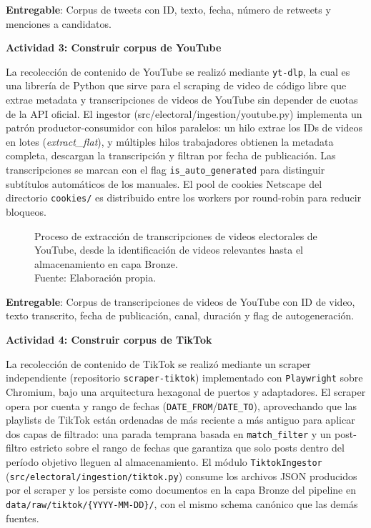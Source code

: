 \textbf{Entregable}: Corpus de tweets con ID, texto, fecha, número de retweets y menciones a candidatos.
 
\textbf{Actividad 3: Construir corpus de YouTube}
 
La recolección de contenido de YouTube se realizó mediante \texttt{yt-dlp}, la cual es una librería de Python que sirve para el scraping de video de código libre que extrae metadata y transcripciones de videos de YouTube sin depender de cuotas de la API oficial. El ingestor (src/electoral/ingestion/youtube.py) implementa un patrón productor-consumidor con hilos paralelos: un hilo extrae los IDs de videos en lotes (\textit{extract\_flat}), y múltiples hilos trabajadores obtienen la metadata completa, descargan la transcripción y filtran por fecha de publicación. Las transcripciones se marcan con el flag \texttt{is\_auto\_generated} para distinguir subtítulos automáticos de los manuales. El pool de cookies Netscape del directorio \texttt{cookies/} es distribuido entre los workers por round-robin para reducir bloqueos.

\begin{figure}[!ht]
    \begin{center}
        \resizebox{0.85\textwidth}{!}{}
        \caption[Proceso de recolección del corpus de transcripciones de YouTube]{Proceso de extracción de transcripciones de videos electorales de YouTube, desde la identificación de videos relevantes hasta el almacenamiento en capa Bronze.\\
            Fuente: Elaboración propia.}
        \label{4:fig6}
    \end{center}
\end{figure}
 
\textbf{Entregable}: Corpus de transcripciones de videos de YouTube con ID de video, texto transcrito, fecha de publicación, canal, duración y flag de autogeneración.

\textbf{Actividad 4: Construir corpus de TikTok}

La recolección de contenido de TikTok se realizó mediante un scraper independiente (repositorio \texttt{scraper-tiktok}) implementado con \texttt{Playwright} sobre Chromium, bajo una arquitectura hexagonal de puertos y adaptadores. El scraper opera por cuenta y rango de fechas (\texttt{DATE\_FROM}/\texttt{DATE\_TO}), aprovechando que las playlists de TikTok están ordenadas de más reciente a más antiguo para aplicar dos capas de filtrado: una parada temprana basada en \texttt{match\_filter} y un post-filtro estricto sobre el rango de fechas que garantiza que solo posts dentro del período objetivo lleguen al almacenamiento. El módulo \texttt{TiktokIngestor} (\texttt{src/electoral/ingestion/tiktok.py}) consume los archivos JSON producidos por el scraper y los persiste como documentos en la capa Bronze del pipeline en \texttt{data/raw/tiktok/\{YYYY-MM-DD\}/}, con el mismo schema canónico que las demás fuentes.

